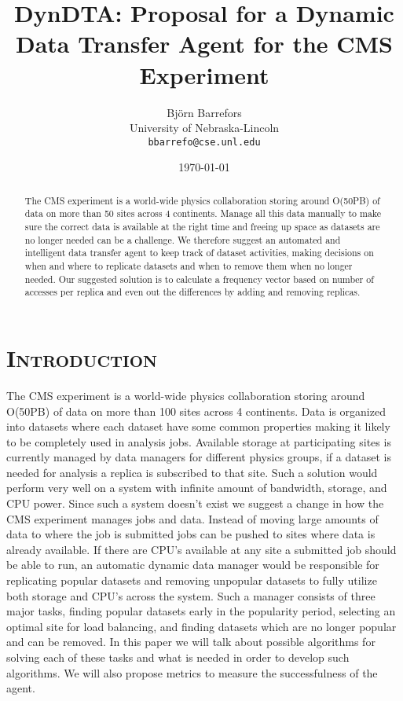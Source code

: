 \documentclass[11pt,a4page]{article}
\title{\textbf{\fontfamily{\sfdefault}\selectfont DynDTA: Proposal for a Dynamic Data Transfer Agent for the CMS Experiment}}
\author{Bj\"{o}rn Barrefors\\
  University of Nebraska-Lincoln\\
  \texttt{bbarrefo@cse.unl.edu}}
\date{\today}
\begin{document}
\maketitle

\begin{abstract}

	The CMS experiment is a world-wide physics collaboration storing around O(50PB) of data on more than 50 sites across 4 continents. Manage all this data manually to make sure the correct data is available at the right time and freeing up space as datasets are no longer needed can be a challenge. We therefore suggest an automated and intelligent data transfer agent to keep track of dataset activities, making decisions on when and where to replicate datasets and when to remove them when no longer needed. Our suggested solution is to calculate a frequency vector based on number of accesses per replica and even out the differences by adding and removing replicas.

\end{abstract}


\section{\textsc{Introduction}}

  The CMS experiment is a world-wide physics collaboration storing around O(50PB) of data on more than 100 sites across 4 continents. Data is organized into datasets where each dataset have some common properties making it likely to be completely used in analysis jobs. Available storage at participating sites is currently managed by data managers for different physics groups, if a dataset is needed for analysis a replica is subscribed to that site. Such a solution would perform very well on a system with infinite amount of bandwidth, storage, and CPU power. Since such a system doesn't exist we suggest a change in how the CMS experiment manages jobs and data. Instead of moving large amounts of data to where the job is submitted jobs can be pushed to sites where data is already available. If there are CPU's available at any site a submitted job should be able to run, an automatic dynamic data manager would be responsible for replicating popular datasets and removing unpopular datasets to fully utilize both storage and CPU's across the system. Such a manager consists of three major tasks, finding popular datasets early in the popularity period, selecting an optimal site for load balancing, and finding datasets which are no longer popular and can be removed. In this paper we will talk about possible algorithms for solving each of these tasks and what is needed in order to develop such algorithms. We will also propose metrics to measure the successfulness of the agent.
\end{document}
